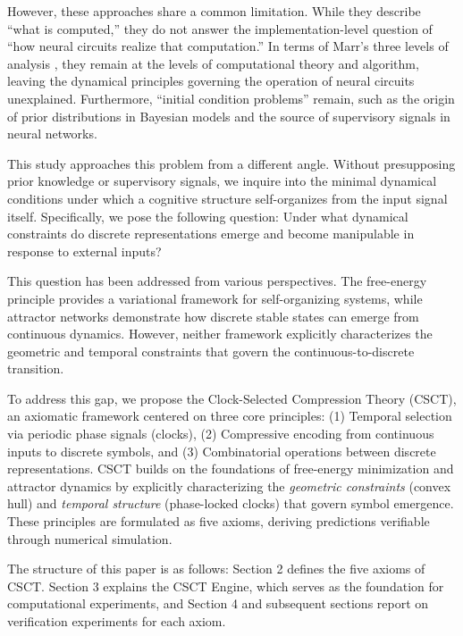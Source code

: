 \documentclass{article}
\begin{document}
However, these approaches share a common limitation. While they describe ``what is computed,'' they do not answer the implementation-level question of ``how neural circuits realize that computation.'' In terms of Marr's three levels of analysis \cite{marr1982vision}, they remain at the levels of computational theory and algorithm, leaving the dynamical principles governing the operation of neural circuits unexplained. Furthermore, ``initial condition problems'' remain, such as the origin of prior distributions in Bayesian models and the source of supervisory signals in neural networks.

This study approaches this problem from a different angle. Without presupposing prior knowledge or supervisory signals, we inquire into the minimal dynamical conditions under which a cognitive structure self-organizes from the input signal itself. Specifically, we pose the following question: Under what dynamical constraints do discrete representations emerge and become manipulable in response to external inputs?

This question has been addressed from various perspectives. The free-energy principle \cite{friston2010free} provides a variational framework for self-organizing systems, while attractor networks \cite{hopfield1982neural} demonstrate how discrete stable states can emerge from continuous dynamics. However, neither framework explicitly characterizes the geometric and temporal constraints that govern the continuous-to-discrete transition.

To address this gap, we propose the Clock-Selected Compression Theory (CSCT), an axiomatic framework centered on three core principles: (1) Temporal selection via periodic phase signals (clocks), (2) Compressive encoding from continuous inputs to discrete symbols, and (3) Combinatorial operations between discrete representations. CSCT builds on the foundations of free-energy minimization and attractor dynamics by explicitly characterizing the \emph{geometric constraints} (convex hull) and \emph{temporal structure} (phase-locked clocks) that govern symbol emergence. These principles are formulated as five axioms, deriving predictions verifiable through numerical simulation.

The structure of this paper is as follows: Section 2 defines the five axioms of CSCT. Section 3 explains the CSCT Engine, which serves as the foundation for computational experiments, and Section 4 and subsequent sections report on verification experiments for each axiom.
\end{document}
